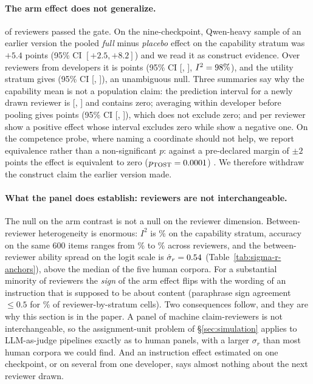 \documentclass[11pt]{article}
\begin{document}
\paragraph{The arm effect does not generalize.}
\CMJpassing{} of \CMJmodels{} reviewers passed the gate. On the
nine-checkpoint, Qwen-heavy sample of an earlier version the pooled \emph{full}
minus \emph{placebo} effect on the capability stratum was $+5.4$ points (95\%
CI $[+2.5,+8.2]$) and we read it as construct evidence. Over \CMJpassing{}
reviewers from \CMJdevelopers{} developers it is \CMJCtwoPooled{} points (95\%
CI [\CMJCtwoLow, \CMJCtwoHigh], $I^2=98\%$), and the utility stratum
gives \CMJCfivePooled{} (95\% CI [\CMJCfiveLow, \CMJCfiveHigh]), an
unambiguous null. Three summaries say why the capability mean is not a
population claim: the prediction interval for a newly drawn reviewer
\citep{higgins2009reintroduction} is [\CMJCtwoPIlow, \CMJCtwoPIhigh] and
contains zero; averaging within developer before pooling gives
\CMJCtwoDevPooled{} points (95\% CI [\CMJCtwoDevLow, \CMJCtwoDevHigh]), which
does not exclude zero; and per reviewer \CMJCtwoPos{} show a positive effect
whose interval excludes zero while \CMJCtwoNeg{} show a negative one. On the
competence probe, where naming a coordinate should not help, we report
equivalence rather than a non-significant $p$: against a pre-declared margin of
$\pm2$ points the effect is equivalent to zero
($p_{\mathrm{TOST}}=0.0001$) \citep{lakens2017equivalence}. We therefore
withdraw the construct claim the earlier version made.

\paragraph{What the panel does establish: reviewers are not interchangeable.}
The null on the arm contrast is not a null on the reviewer dimension.
Between-reviewer heterogeneity is enormous: $I^2$ is \CMJCtwoIsq\% on the
capability stratum, accuracy on the same 600 items ranges from \CMJprobeMin\%
to \CMJprobeMax\% across reviewers, and the between-reviewer ability spread on
the logit scale is $\hat\sigma_r=0.54$
(Table~\ref{tab:sigma-r-anchors}), above the median of the five human corpora.
For a substantial minority of reviewers the \emph{sign} of the arm effect flips
with the wording of an instruction that is supposed to be about content
(paraphrase sign agreement $\le0.5$ for \CMJSignBelowHalf\% of
reviewer-by-stratum cells). Two consequences follow, and they are why this
section is in the paper. A panel of machine claim-reviewers is not
interchangeable, so the assignment-unit problem of \S\ref{sec:simulation}
applies to LLM-as-judge pipelines exactly as to human panels, with a larger
$\sigma_r$ than most human corpora we could find. And an instruction effect
estimated on one checkpoint, or on several from one developer, says almost
nothing about the next reviewer drawn.
\end{document}
